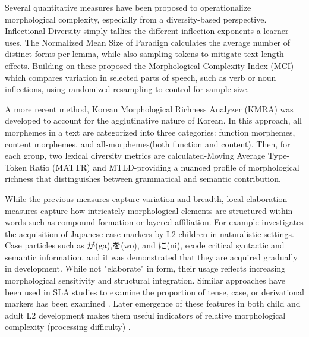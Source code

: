 Several quantitative measures have been proposed to operationalize morphological complexity, especially
from a diversity-based perspective. Inflectional Diversity
\citep{Malvern2004} simply tallies the
different inflection exponents a learner uses. The Normalized Mean Size of Paradign \citep{Xanthos2010} calculates
the average number of distinct forms per lemma, while also sampling tokens to mitigate text-length effects. Building
on these \cite{Brezina2019} proposed the Morphological Complexity Index (MCI) which compares variation in selected
parts of
speech, such as verb or noun
inflections, using
randomized resampling to control for sample size.

A more recent method, Korean Morphological Richness Analyzer (KMRA)
\citep{Hwang2024} was developed to account for the agglutinative nature of Korean. In this approach, all morphemes in
a text are categorized into three categories: function morphemes, content morphemes, and all-morphemes(both function
and content).
Then, for
each group, two lexical diversity metrics are calculated-Moving Average Type-Token Ratio (MATTR)\citep{Covington2010} and MTLD\citep{McCarthy2010}-providing
a nuanced profile of morphological richness that distinguishes between grammatical and semantic contribution.

While the previous measures capture variation and breadth, local elaboration measures capture how intricately
morphological elements are structured within words-such as compound formation or layered
affiliation. For example \cite{Nishikawa2023} investigates the acquisition of Japanese case markers by L2 children
in naturalistic settings. Case particles such as が(ga),を(wo), and に(ni), ecode critical syntactic and semantic
information, and it was demonstrated that they are acquired gradually in development. While not "elaborate" in form,
their usage reflects increasing morphological sensitivity and structural integration. Similar approaches have been
used in SLA studies to examine the proportion of tense, case, or derivational markers has been
examined
\citep{Verspoor2012,Guo2013, reynolds2016-insights,DeClercq2019}. Later emergence of these features in both child
and adult L2 development makes them useful indicators of relative morphological complexity (processing difficulty)
\citep{Butle2012}.

